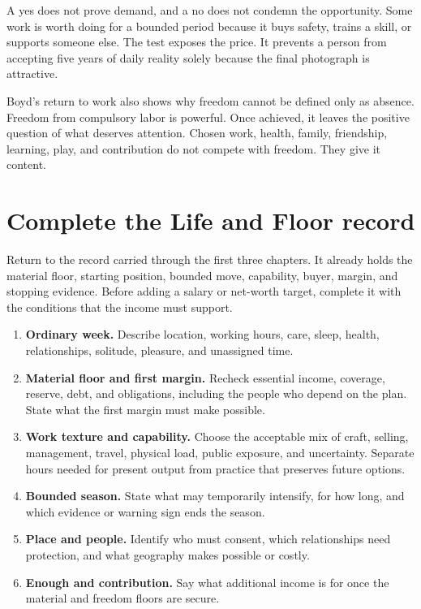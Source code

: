 A yes does not prove demand, and a no does not condemn the opportunity. Some
work is worth doing for a bounded period because it buys safety, trains a skill,
or supports someone else. The test exposes the price. It prevents a person from
accepting five years of daily reality solely because the final photograph is
attractive.

Boyd's return to work also shows why freedom cannot be defined only as absence.
Freedom from compulsory labor is powerful. Once achieved, it leaves the
positive question of what deserves attention. Chosen work, health, family,
friendship, learning, play, and contribution do not compete with freedom. They
give it content.

\section{Complete the Life and Floor record}

Return to the record carried through the first three chapters. It already holds
the material floor, starting position, bounded move, capability, buyer, margin,
and stopping evidence. Before adding a salary or net-worth target, complete it
with the conditions that the income must support.

\begin{enumerate}[itemsep=0.25em]
\item \textbf{Ordinary week.} Describe location, working hours, care, sleep,
  health, relationships, solitude, pleasure, and unassigned time.
\item \textbf{Material floor and first margin.} Recheck essential income,
  coverage, reserve, debt, and obligations, including the people who depend on
  the plan. State what the first margin must make possible.
\item \textbf{Work texture and capability.} Choose the acceptable mix of craft,
  selling, management, travel, physical load, public exposure, and uncertainty.
  Separate hours needed for present output from practice that preserves future
  options.
\item \textbf{Bounded season.} State what may temporarily intensify, for how
  long, and which evidence or warning sign ends the season.
\item \textbf{Place and people.} Identify who must consent, which relationships
  need protection, and what geography makes possible or costly.
\item \textbf{Enough and contribution.} Say what additional income is for once
  the material and freedom floors are secure.
\end{enumerate}

